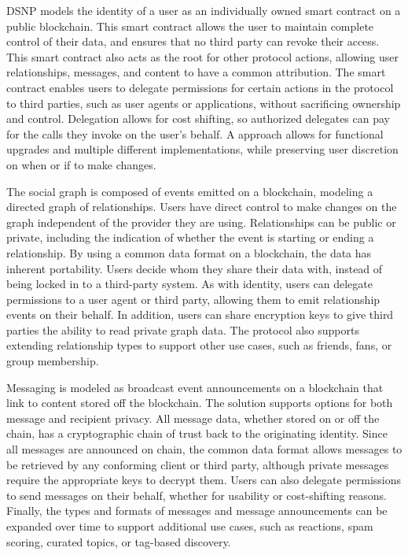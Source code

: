 \documentclass[12pt,letterpaper]{article}
\begin{document}
DSNP models the identity of a user as an individually owned smart contract on a public
blockchain. This smart contract allows the user to maintain complete control of their
data, and ensures that no third party can revoke their access. This smart contract also
acts as the root for other protocol actions, allowing user relationships, messages, and
content to have a common attribution. The smart contract enables users to delegate
permissions for certain actions in the protocol to third parties, such as user agents or
applications, without sacrificing ownership and control. Delegation allows for cost
shifting, so authorized delegates can pay for the calls they invoke on the user's behalf.
A  approach allows for functional upgrades and multiple different
implementations, while preserving user discretion on when or if to make changes.

The social graph is composed of events emitted on a blockchain, modeling a directed graph
of  relationships. Users have direct control to make changes on the graph
independent of the provider they are using. Relationships can be public or private,
including the indication of whether the event is starting or ending a relationship. By
using a common data format on a blockchain, the data has inherent portability. Users
decide whom they share their data with, instead of being locked in to a third-party
system. As with identity, users can delegate permissions to a user agent or third party,
allowing them to emit relationship events on their behalf. In addition, users can share
encryption keys to give third parties the ability to read private graph data. The protocol
also supports extending relationship types to support other use cases, such as friends,
fans, or group membership.

Messaging is modeled as broadcast event announcements on a blockchain that link to content
stored off the blockchain. The solution supports options for both message and recipient
privacy. All message data, whether stored on or off the chain, has a cryptographic chain
of trust back to the originating identity. Since all messages are announced on chain, the
common data format allows messages to be retrieved by any conforming client or third
party, although private messages require the appropriate keys to decrypt them. Users can
also delegate permissions to send messages on their behalf, whether for usability or
cost-shifting reasons. Finally, the types and formats of messages and message
announcements can be expanded over time to support additional use cases, such as
reactions, spam scoring, curated topics, or tag-based discovery.
\end{document}
